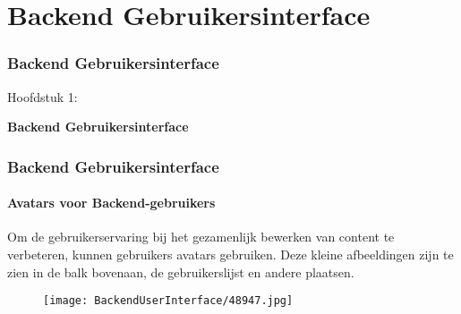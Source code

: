 %

\section{Backend Gebruikersinterface}
\begin{frame}[fragile]
	\frametitle{Backend Gebruikersinterface}

	\begin{center}\huge{Hoofdstuk 1:}\end{center}
	\begin{center}\huge{\color{typo3darkgrey}\textbf{Backend Gebruikersinterface}}\end{center}

\end{frame}

\begin{frame}[fragile]
	\frametitle{Backend Gebruikersinterface}
	\framesubtitle{Avatars voor Backend-gebruikers}

	Om de gebruikerservaring bij het gezamenlijk bewerken van content te verbeteren, kunnen gebruikers
	avatars gebruiken. Deze kleine afbeeldingen zijn te zien in de balk bovenaan, de gebruikerslijst
	en andere plaatsen.

	\begin{figure}
		\texttt{[image: BackendUserInterface/48947.jpg]}
	\end{figure}

\end{frame}

